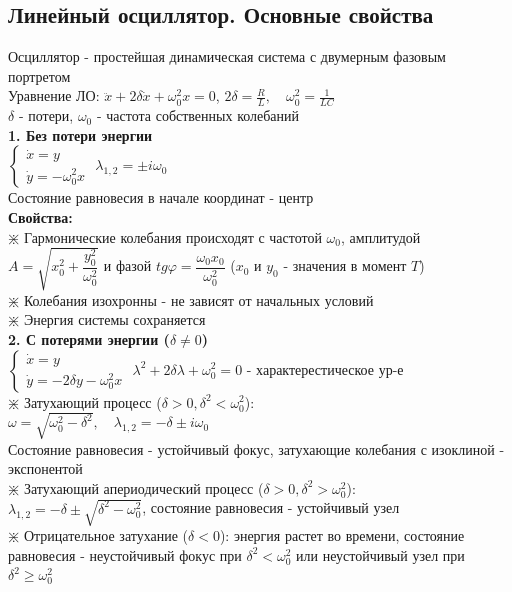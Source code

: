 \begin{multicols*}{2}
		\section{Линейный осциллятор. Основные свойства}
		Осциллятор - простейшая динамическая система с двумерным фазовым портретом\\
		Уравнение ЛО: $\ddot{x} + 2\delta \dot{x} + \omega_0^2 x = 0$, \quad $2\delta = \frac{R}{L}, \quad \omega_0^2 = \frac{1}{LC}$\\
		$\delta $ - потери, $\omega_0$ - частота собственных колебаний\\
		\textbf{1. Без потери энергии}\\
		$\begin{cases}
			\dot{x} = y \\
			\dot{y} = -\omega_0^2 x
		\end{cases} $
		\quad \quad $\lambda_{1,2} = \pm i\omega_0$\\
		Состояние равновесия в начале координат - центр\\
		\textbf{Свойства:}\\
		$\divideontimes$ Гармонические колебания происходят с частотой $\omega_0$, амплитудой $A = \sqrt{x_0^2 + \dfrac{y_0^2}{\omega_0^2}}$ и фазой $tg \varphi = \dfrac{\omega_0 x_0}{\omega_0^2}$ ($x_0$ и $y_0$ - значения в момент $T$)\\
		$\divideontimes$ Колебания изохронны - не зависят от начальных условий\\
		$\divideontimes$ Энергия системы сохраняется\\
		\textbf{2. С потерями энергии ($\delta \neq 0$)}\\
		$\begin{cases}
			\dot{x} = y \\
			\dot{y} = -2\delta y-\omega_0^2 x
		\end{cases} $
		\quad \quad $\lambda^2 + 2\delta \lambda + \omega_0^2 = 0$ - характерестическое ур-е\\
		$\divideontimes$ Затухающий процесс ($\delta > 0, \delta^2 < \omega_0^2$):\\
		$\omega = \sqrt{\omega_0^2 - \delta^2}, \quad \lambda_{1,2} = -\delta \pm i\omega_0$\\
		Состояние равновесия - устойчивый фокус, затухающие колебания с изоклиной - экспонентой\\
		$\divideontimes$ Затухающий апериодический процесс ($\delta > 0, \delta^2 > \omega_0^2$):\\
		$\lambda_{1,2} = -\delta \pm \sqrt{\delta^2 - \omega_0^2}$, состояние равновесия - устойчивый узел\\
		$\divideontimes$ Отрицательное затухание ($\delta<0$): энергия растет во времени, состояние равновесия - неустойчивый фокус при $\delta^2<\omega_0^2$ или неустойчивый узел при $\delta^2\geqslant \omega_0^2$


\end{multicols*}
